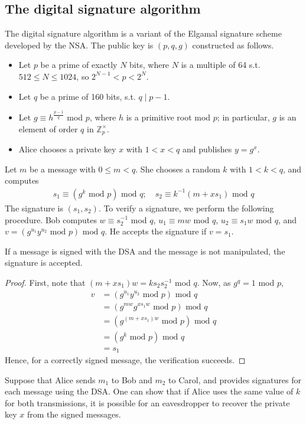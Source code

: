 \subsection{The digital signature algorithm}
The digital signature algorithm is a variant of the Elgamal signature scheme developed by the NSA.
The public key is $(p, q, g)$ constructed as follows.
\begin{itemize}
    \item Let $p$ be a prime of exactly $N$ bits, where $N$ is a multiple of 64 s.t. $512 \leq N \leq 1024$, so $2^{N-1} < p < 2^N$.
    \item Let $q$ be a prime of 160 bits, s.t. $q \mid p-1$.
    \item Let $g \equiv h^{\frac{p-1}{q}}$ mod $p$, where $h$ is a primitive root mod $p$; in particular, $g$ is an element of order $q$ in $\mathbb Z_p^\times$.
    \item Alice chooses a private key $x$ with $1 < x < q$ and publishes $y = g^x$.
\end{itemize}
Let $m$ be a message with $0 \leq m < q$.
She chooses a random $k$ with $1 < k < q$, and computes
\begin{align*}
    s_1 \equiv (g^k \text{ mod } p) \text{ mod } q;\quad s_2 \equiv k^{-1}(m+xs_1) \text{ mod } q
\end{align*}
The signature is $(s_1, s_2)$.
To verify a signature, we perform the following procedure.
Bob computes $w \equiv s_2^{-1}$ mod $q$, $u_1 \equiv mw$ mod $q$, $u_2 \equiv s_1 w$ mod $q$, and $v = (g^{u_1} y^{u_2} \text{ mod } p) \text{ mod } q$.
He accepts the signature if $v = s_1$.
\begin{proposition}
    If a message is signed with the DSA and the message is not manipulated, the signature is accepted.
\end{proposition}
\begin{proof}
    First, note that $(m + xs_1)w = ks_2s_2^{-1}$ mod $q$.
    Now, as $g^q = 1$ mod $p$,
    \begin{align*}
        v &= (g^{u_1} y^{u_2} \text{ mod } p) \text{ mod } q \\
        &= (g^{mw} g^{xs_1 w} \text{ mod } p) \text{ mod } q \\
        &= (g^{(m + xs_1)w} \text{ mod } p) \text{ mod } q \\
        &= (g^k \text{ mod } p) \text{ mod } q \\
        &= s_1
    \end{align*}
    Hence, for a correctly signed message, the verification succeeds.
\end{proof}
Suppose that Alice sends $m_1$ to Bob and $m_2$ to Carol, and provides signatures for each message using the DSA.
One can show that if Alice uses the same value of $k$ for both transmissions, it is possible for an eavesdropper to recover the private key $x$ from the signed messages.

